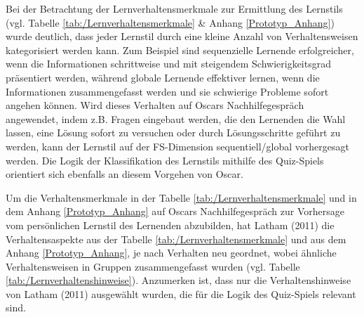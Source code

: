 Bei der Betrachtung der Lernverhaltensmerkmale zur Ermittlung des Lernstils  (vgl. Tabelle \ref{tab:/Lernverhaltensmerkmale} \& Anhang \ref{Prototyp_Anhang}) wurde deutlich,
dass jeder Lernstil durch eine kleine Anzahl von Verhaltensweisen kategorisiert werden kann. Zum Beispiel sind sequenzielle Lernende erfolgreicher,
wenn die Informationen schrittweise und mit steigendem 
Schwierigkeitsgrad präsentiert werden, während globale Lernende effektiver lernen, wenn die Informationen zusammengefasst werden und sie 
schwierige Probleme sofort angehen können. Wird dieses Verhalten auf Oscars Nachhilfegespräch angewendet, indem z.B. Fragen eingebaut werden, die den 
Lernenden die Wahl lassen, eine Lösung sofort zu versuchen oder durch Lösungsschritte geführt zu werden, kann der Lernstil 
auf der FS-Dimension sequentiell/global vorhergesagt werden.  \parencite[57]{Latham.2011} 
Die Logik der Klassifikation des Lernstils mithilfe des Quiz-Spiels orientiert sich ebenfalls 
an diesem Vorgehen von Oscar. 

Um die Verhaltensmerkmale in der Tabelle \ref{tab:/Lernverhaltensmerkmale} und in dem Anhang \ref{Prototyp_Anhang} auf Oscars Nachhilfegespräch zur Vorhersage vom persönlichen Lernstil des Lernenden abzubilden,
hat  Latham (2011) die Verhaltensaspekte aus der Tabelle \ref{tab:/Lernverhaltensmerkmale} und aus dem Anhang \ref{Prototyp_Anhang}, je nach Verhalten neu geordnet, 
wobei ähnliche Verhaltensweisen in Gruppen zusammengefasst wurden (vgl. Tabelle \ref{tab:/Lernverhaltenshinweise}). \parencite[57 f.]{Latham.2011}
Anzumerken ist, dass nur die Verhaltenshinweise von Latham (2011) ausgewählt wurden, die für die Logik des
Quiz-Spiels relevant sind.
   


